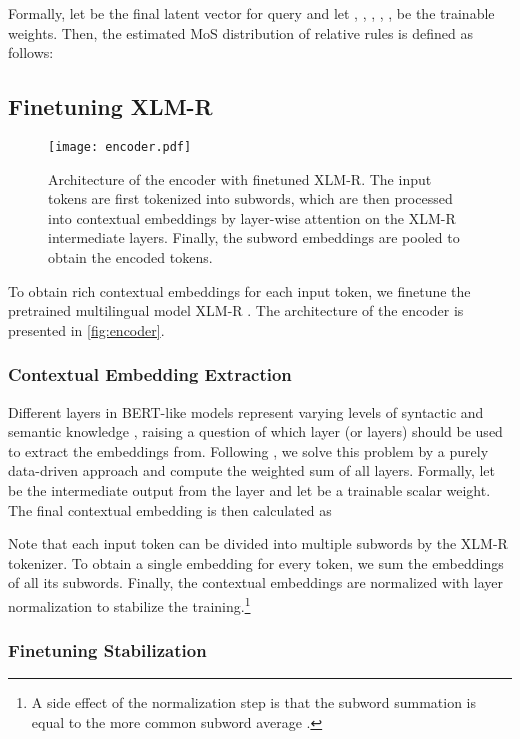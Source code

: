 \documentclass[11pt,a4paper]{article}
\begin{document}
Formally, let  be the final latent vector for query  and let , , , , ,  be the trainable weights. Then, the estimated MoS distribution of relative rules  is defined as follows: \subsection{Finetuning XLM-R}
\label{section:xlm}

\begin{figure}
\texttt{[image: encoder.pdf]}
\caption{Architecture of the encoder with finetuned XLM-R. The input tokens are first tokenized into subwords, which are then processed into contextual embeddings by layer-wise attention on the XLM-R intermediate layers. Finally, the subword embeddings are pooled to obtain the encoded tokens.}
\label{fig:encoder}
\end{figure}

To obtain rich contextual embeddings for each input token, we finetune the pretrained multilingual model XLM-R \cite{conneau2019unsupervised}.
The architecture of the encoder is presented in \autoref{fig:encoder}.

\subsubsection{Contextual Embedding Extraction}
\label{section:contextual_embedding_extraction}

Different layers in BERT-like models represent varying levels of syntactic and semantic knowledge \cite{van2019does}, raising a question of which layer (or layers) should be used to extract the embeddings from. Following \citet{kondratyuk201975}, we solve this problem by a purely data-driven approach and compute the weighted sum of all layers. Formally, let  be the intermediate output from the  layer and let  be a trainable scalar weight. The final contextual embedding is then calculated as

Note that each input token can be divided into multiple subwords by the XLM-R tokenizer. To obtain a single embedding for every token, we sum the embeddings of all its subwords. Finally, the contextual embeddings are normalized with layer normalization \cite{ba2016layer} to stabilize the training.\nobreak\hspace{-.08em}\footnote{A side effect of the normalization step is that the subword summation is equal to the more common subword average \cite{zhang2019amr}.}

\subsubsection{Finetuning Stabilization}
\end{document}
